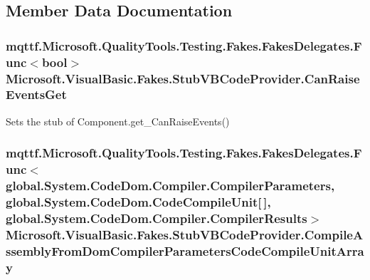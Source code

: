 \subsection{Member Data Documentation}
\hypertarget{class_microsoft_1_1_visual_basic_1_1_fakes_1_1_stub_v_b_code_provider_a9c1638d77fa535a4e8cc3a3e260ed8d2}{
\subsubsection[{Can\-Raise\-Events\-Get}]{\setlength{\rightskip}{0pt plus 5cm}mqttf.\-Microsoft.\-Quality\-Tools.\-Testing.\-Fakes.\-Fakes\-Delegates.\-Func$<$bool$>$ Microsoft.\-Visual\-Basic.\-Fakes.\-Stub\-V\-B\-Code\-Provider.\-Can\-Raise\-Events\-Get}}\label{class_microsoft_1_1_visual_basic_1_1_fakes_1_1_stub_v_b_code_provider_a9c1638d77fa535a4e8cc3a3e260ed8d2}


Sets the stub of Component.\-get\-\_\-\-Can\-Raise\-Events()

\hypertarget{class_microsoft_1_1_visual_basic_1_1_fakes_1_1_stub_v_b_code_provider_a4d6cc9e593a6a5ed3cfe268c01bacea7}{
\subsubsection[{Compile\-Assembly\-From\-Dom\-Compiler\-Parameters\-Code\-Compile\-Unit\-Array}]{\setlength{\rightskip}{0pt plus 5cm}mqttf.\-Microsoft.\-Quality\-Tools.\-Testing.\-Fakes.\-Fakes\-Delegates.\-Func$<$global.\-System.\-Code\-Dom.\-Compiler.\-Compiler\-Parameters, global.\-System.\-Code\-Dom.\-Code\-Compile\-Unit\mbox{[}$\,$\mbox{]}, global.\-System.\-Code\-Dom.\-Compiler.\-Compiler\-Results$>$ Microsoft.\-Visual\-Basic.\-Fakes.\-Stub\-V\-B\-Code\-Provider.\-Compile\-Assembly\-From\-Dom\-Compiler\-Parameters\-Code\-Compile\-Unit\-Array}}\label{class_microsoft_1_1_visual_basic_1_1_fakes_1_1_stub_v_b_code_provider_a4d6cc9e593a6a5ed3cfe268c01bacea7}


